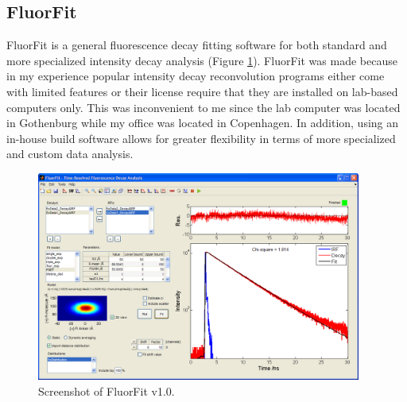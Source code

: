 \subsection{FluorFit}
 FluorFit is a general fluorescence decay fitting software for both standard and more specialized intensity decay analysis (Figure \ref{Fig:chap_Papers_fluorfit}). FluorFit was made because in my experience popular intensity decay reconvolution programs either come with limited features or their license require that they are installed on lab-based computers only. This was inconvenient to me since the lab computer was located in Gothenburg while my office was located in Copenhagen. In addition, using an in-house build software allows for greater flexibility in terms of more specialized and custom data analysis.

\begin{figure}
    \centering
        \includegraphics[width=0.95\textwidth]{adds//fluorfit_fig.png}
    \captionsetup{width=.95\textwidth}
    \caption{Screenshot of FluorFit v1.0.}
    \label{Fig:chap_Papers_fluorfit}
\end{figure}

